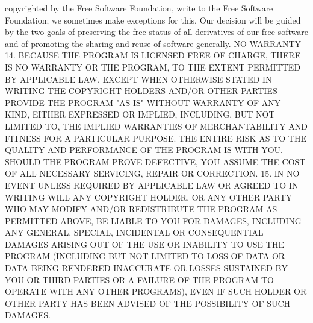 \documentclass[12pt]{article}
\begin{document}
copyrighted by the Free Software Foundation, write to the Free Software Foundation; we
sometimes make exceptions for this. Our decision will be guided by the two goals of
preserving the free status of all derivatives of our free software and of promoting the sharing
and reuse of software generally.
NO WARRANTY
14. BECAUSE THE PROGRAM IS LICENSED FREE OF CHARGE, THERE IS NO
WARRANTY OR THE PROGRAM, TO THE EXTENT PERMITTED BY APPLICABLE LAW.
EXCEPT WHEN OTHERWISE STATED IN WRITING THE COPYRIGHT HOLDERS
AND/OR OTHER PARTIES PROVIDE THE PROGRAM "AS IS" WITHOUT WARRANTY OF
ANY KIND, EITHER EXPRESSED OR IMPLIED, INCLUDING, BUT NOT LIMITED TO, THE
IMPLIED WARRANTIES OF MERCHANTABILITY AND FITNESS FOR A PARTICULAR
PURPOSE. THE ENTIRE RISK AS TO THE QUALITY AND PERFORMANCE OF THE
PROGRAM IS WITH YOU. SHOULD THE PROGRAM PROVE DEFECTIVE, YOU ASSUME
THE COST OF ALL NECESSARY SERVICING, REPAIR OR CORRECTION.
15. IN NO EVENT UNLESS REQUIRED BY APPLICABLE LAW OR AGREED TO IN WRITING
WILL ANY COPYRIGHT HOLDER, OR ANY OTHER PARTY WHO MAY MODIFY AND/OR
REDISTRIBUTE THE PROGRAM AS PERMITTED ABOVE, BE LIABLE TO YOU FOR
DAMAGES, INCLUDING ANY GENERAL, SPECIAL, INCIDENTAL OR CONSEQUENTIAL
DAMAGES ARISING OUT OF THE USE OR INABILITY TO USE THE PROGRAM
(INCLUDING BUT NOT LIMITED TO LOSS OF DATA OR DATA BEING RENDERED
INACCURATE OR LOSSES SUSTAINED BY YOU OR THIRD PARTIES OR A FAILURE
OF THE PROGRAM TO OPERATE WITH ANY OTHER PROGRAMS), EVEN IF SUCH
HOLDER OR OTHER PARTY HAS BEEN ADVISED OF THE POSSIBILITY OF SUCH
DAMAGES.
\end{document}
